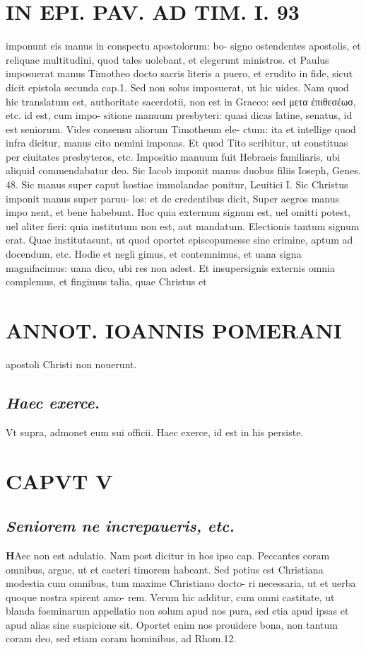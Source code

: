 \documentclass{article}
\begin{document}
\begin{pages}
\section*{IN EPI. PAV. AD TIM. I. 93 }
\marginpar{[ p.93 ]}\pstart imponunt eis manus in conspectu apostolorum: bo- signo ostendentes apostolis, et reliquae multitudini, quod tales uolebant, et elegerunt ministros. et Paulus imposuerat manus Timotheo docto sacris literis a puero, et erudito in fide, sicut dicit epistola secunda cap.1. Sed non solus imposuerat, ut hic uides. Nam quod hic translatum est, authoritate sacerdotii, non est in Graeco: sed μετα ἐπιθεσέωσ, etc. id est, cum impo- sitione manuum presbyteri: quasi dicas latine, senatus, id est seniorum. Vides consensu aliorum Timotheum ele- ctum: ita et intellige quod infra dicitur, manus cito nemini imponas. Et quod Tito scribitur, ut constituas per ciuitates presbyteros, etc. Impositio manuum fuit Hebraeis familiaris, ubi aliquid commendabatur deo. Sic Iacob imponit manus duobus filiis Ioseph, Genes. 48. Sic manus super caput hostiae immolandae ponitur, Leuitici I. Sic Christus imponit manus super paruu- los: et de credentibus dicit, Super aegros manus impo nent, et bene habebunt. Hoc quia externum signum est, uel omitti potest, uel aliter fieri: quia institutum non est, aut mandatum. Electionis tantum signum erat. Quae institutasunt, ut quod oportet episcopumesse sine crimine, aptum ad docendum, etc. Hodie et negli gimus, et contemnimus, et uana signa magnifacimus: uana dico, ubi res non adest. Et insupersignis externis omnia complemus, et fingimus talia, quae Christus et  \pend
\section*{ANNOT. IOANNIS POMERANI }\pstart apostoli Christi non nouerunt.  \pend
{}
{}
\subsection*{\textit{Haec exerce. }}\pstart Vt supra, admonet eum sui officii. Haec exerce, id est in his persiste.  \pend
\endnumbering\beginnumbering\section{CAPVT V}
{}
\subsection*{\textit{Seniorem ne increpaueris, etc. }}\pstart \huge\textbf{H}\normalsize Aec non est adulatio. Nam post dicitur in hos ipso cap. Peccantes coram omnibus, argue, ut et caeteri timorem habeant. Sed potius est Christiana modestia cum omnibus, tum maxime Christiano docto- ri necessaria, ut et uerba quoque nostra spirent amo- rem. Verum hic additur, cum omni castitate, ut blanda foeminarum appellatio non solum apud nos pura, sed etia apud ipsas et apud alias sine suspicione sit. Oportet enim nos prouidere bona, non tantum coram deo, sed etiam coram hominibus, ad Rhom.12.  \pend
{}
{}

\end{pages}
\end{document}
